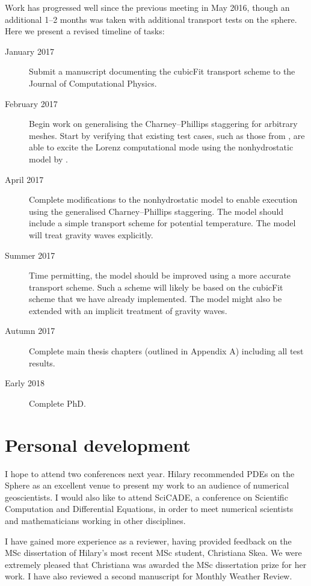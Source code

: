 \documentclass[a4paper,11pt]{article}
\begin{document}
Work has progressed well since the previous meeting in May 2016, though an additional 1--2 months was taken with additional transport tests on the sphere.  Here we present a revised timeline of tasks:
\begin{description}
\item[January 2017]{Submit a manuscript documenting the cubicFit transport scheme to the Journal of Computational Physics.}
\item[February 2017]{Begin work on generalising the Charney--Phillips staggering for arbitrary meshes.  Start by verifying that existing test cases, such as those from \citet{arakawa-konor1996}, are able to excite the Lorenz computational mode using the nonhydrostatic model by \citet{weller-shahrokhi2014}.}
\item[April 2017]{Complete modifications to the nonhydrostatic model to enable execution using the generalised Charney--Phillips staggering.  The model should include a simple transport scheme for potential temperature.  The model will treat gravity waves explicitly.}
\item[Summer 2017]{Time permitting, the model should be improved using a more accurate transport scheme.  Such a scheme will likely be based on the cubicFit scheme that we have already implemented.  The model might also be extended with an implicit treatment of gravity waves.}
\item[Autumn 2017]{Complete main thesis chapters (outlined in Appendix A) including all test results.}
\item[Early 2018]{Complete PhD.}
\end{description}

\section{Personal development}
I hope to attend two conferences next year.  Hilary recommended PDEs on the Sphere as an excellent venue to present my work to an audience of numerical geoscientists.  I would also like to attend SciCADE, a conference on Scientific Computation and Differential Equations, in order to meet numerical scientists and mathematicians working in other disciplines.

I have gained more experience as a reviewer, having provided feedback on the MSc dissertation of Hilary's most recent MSc student, Christiana Skea.  We were extremely pleased that Christiana was awarded the MSc dissertation prize for her work.  I have also reviewed a second manuscript for Monthly Weather Review.
\end{document}
